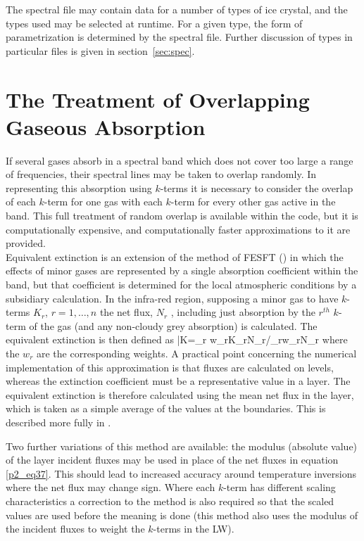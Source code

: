 The spectral file may contain data for a number of types of ice crystal,
and the types used may be selected at runtime. For a given type,
the form of parametrization is determined by the spectral file. Further
discussion of types in particular files is given in section~\ref{sec:spec}. 


\section{The Treatment of Overlapping Gaseous Absorption}

If several gases absorb in a spectral band which does not cover too 
large a range of frequencies, 
their spectral lines may be taken to overlap randomly. In representing 
this absorption using $k$-terms 
it is necessary to consider the overlap of each $k$-term for one gas 
with each $k$-term for every 
other gas active in the band. This full treatment of random overlap is 
available within the code, 
but it is computationally expensive, and computationally faster 
approximations to it are provided.\\

\noindent
Equivalent extinction is an extension of the method of FESFT 
(\cite{Ritter92}) in which the effects of 
minor gases are represented 
by a single absorption coefficient within the band, but that 
coefficient is determined for the local 
atmospheric conditions by a  subsidiary calculation. In the infra-red 
region, supposing a minor gas 
to have $k$-terms $K_{r}$, $r=1, \dots,n$ the net flux, $N_{r}$  , 
including just absorption by 
the $r^{th}$ $k$-term of the gas (and any non-cloudy  grey 
absorption) is calculated. The equivalent 
extinction is then defined as
\beq
\bar{K}=\sum_{r} w_{r}K_{r}N_{r}/\sum_{r}w_{r}N_{r}
\label{p2_eq37}
\eeq
where the $w_{r}$ are the corresponding weights. A practical point 
concerning the numerical 
implementation of this approximation is that fluxes are calculated on 
levels, whereas the extinction 
coefficient must be a representative value in a layer. The equivalent 
extinction is therefore 
calculated using the mean net flux in the layer, which is taken as a 
simple average of the values 
at the boundaries. This is described more fully in \cite{Edwards96ek}.

\noindent
Two further variations of this method are available: the modulus
(absolute value) of the layer incident fluxes may be used in place of the
net fluxes in equation \ref{p2_eq37}. This should lead to increased
accuracy around temperature inversions where the net flux may change sign.
Where each $k$-term has different scaling characteristics a correction to
the method is also required so that the scaled values are used before
the meaning is done (this method also uses the modulus of the incident
fluxes to weight the $k$-terms in the LW).

